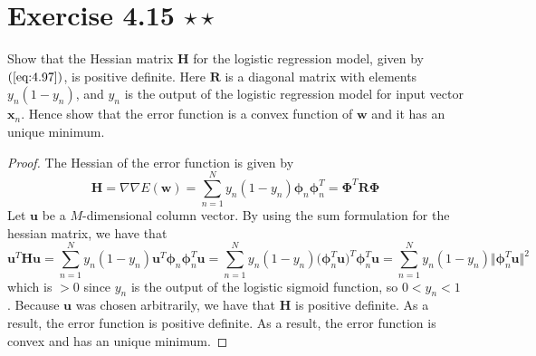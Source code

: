 \section*{Exercise 4.15 $\star \star$}
Show that the Hessian matrix $\mathbf{H}$ for the logistic regression
model, given by $(\ref{eq:4.97})$, is positive definite. Here $\mathbf{R}$
is a diagonal matrix with elements $y_n(1 - y_n)$, and $y_n$ is
the output of the logistic regression model for input vector $\mathbf{x}_n$.
Hence show that the error function is a convex function of $\mathbf{w}$
and it has an unique minimum.

\vspace{1em}

\begin{proof}
    The Hessian of the error function is given by
    \begin{equation}\label{eq:4.97}\tag{4.97}
        \mathbf{H} 
        = \nabla \nabla E(\mathbf{w})
        = \sum_{n=1}^{N} y_n(1 - y_n)\bm{\phi}_n\bm{\phi}_n^T
        = \mathbf{\Phi}^T\mathbf{R}\mathbf{\Phi}
    \end{equation}
    Let $\mathbf{u}$ be a $M$-dimensional column vector.
    By using the sum formulation for the hessian matrix, we have that
    \[
        \mathbf{u}^T\mathbf{H}\mathbf{u} 
        = \sum_{n=1}^{N} y_n(1 - y_n)\mathbf{u}^T\bm{\phi}_n\bm{\phi}_n^T\mathbf{u}
        = \sum_{n=1}^{N} y_n(1 - y_n) \big(\bm{\phi}_n^T\mathbf{u}\big)^T \bm{\phi}_n^T\mathbf{u}
        = \sum_{n=1}^{N} y_n(1 - y_n) \Vert\bm{\phi}_n^T \mathbf{u}\Vert^2
    \] 
    which is $>0$ since $y_n$ is the output of the logistic sigmoid function,
    so $0 < y_n < 1$. Because $\mathbf{u}$ was chosen arbitrarily, we have that
    $\mathbf{H}$ is positive definite. As a result, the error function is 
    positive definite. As a result, the error function is convex and has an unique
    minimum.
\end{proof}
